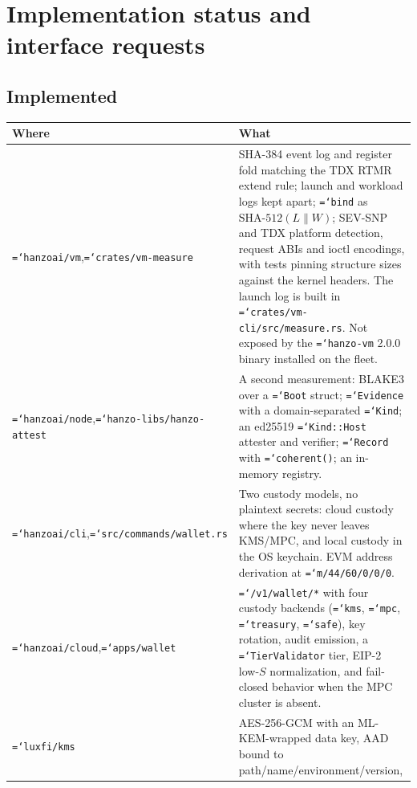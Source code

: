 \documentclass[11pt,a4paper]{article}
\newcommand{\code}[1]{\texttt{\hyphenchar\font=`\-\relax #1}}
\newcommand{\sha}[1]{\mathrm{SHA\text{-}#1}}
\begin{document}
\section{Implementation status and interface requests}
\label{sec:status}

\subsection{Implemented}

\begin{center}
\small
\begin{tabular}{@{}>{\raggedright\arraybackslash}p{}>{\raggedright\arraybackslash}p{}@{}}
\toprule
\textbf{Where} & \textbf{What} \\
\midrule
\code{hanzoai/vm},\newline \code{crates/vm-measure} &
SHA-384 event log and register fold matching the TDX RTMR extend rule; launch and
workload logs kept apart; \code{bind} as $\sha{512}(L \| W)$; SEV-SNP and TDX
platform detection, request ABIs and ioctl encodings, with tests pinning structure
sizes against the kernel headers. The launch log is built in
\code{crates/vm-cli/src/measure.rs}. Not exposed by the \code{hanzo-vm} 2.0.0
binary installed on the fleet. \\[3pt]
\code{hanzoai/node},\newline \code{hanzo-libs/hanzo-attest} &
A second measurement: BLAKE3 over a \code{Boot} struct; \code{Evidence} with a
domain-separated \code{Kind}; an ed25519 \code{Kind::Host} attester and verifier;
\code{Record} with \code{coherent()}; an in-memory registry. \\[3pt]
\code{hanzoai/cli},\newline \code{src/commands/wallet.rs} &
Two custody models, no plaintext secrets: cloud custody where the key never leaves
KMS/MPC, and local custody in the OS keychain. EVM address derivation at
\code{m/44\textquotesingle/60\textquotesingle/0\textquotesingle/0/0}. \\[3pt]
\code{hanzoai/cloud},\newline \code{apps/wallet} &
\code{/v1/wallet/*} with four custody backends (\code{kms}, \code{mpc},
\code{treasury}, \code{safe}), key rotation, audit emission, a \code{TierValidator}
tier, EIP-2 low-$S$ normalization, and fail-closed behavior when the MPC cluster
is absent. \\[3pt]
\code{luxfi/kms} &
AES-256-GCM with an ML-KEM-wrapped data key, AAD bound to path/name/environment/version,

\end{tabular}
\end{center}
\end{document}
